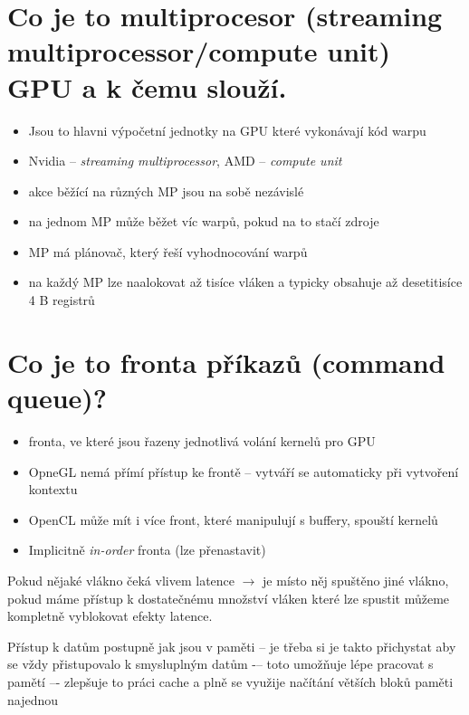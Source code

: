 \section{Co je to multiprocesor (streaming multiprocessor/compute unit) GPU a k čemu slouží.}
	\begin{itemize}
		\setlength\itemsep{0em}
		\item Jsou to hlavni výpočetní jednotky na GPU které vykonávají kód warpu
		\item Nvidia -- \emph{streaming multiprocessor}, AMD -- \emph{compute unit}
		\item akce běžící na různých MP jsou na sobě nezávislé
		\item na jednom MP může běžet víc warpů, pokud na to stačí zdroje
		\item MP má plánovač, který řeší vyhodnocování warpů
		\item na každý MP lze naalokovat až tisíce vláken a typicky obsahuje až desetitisíce 4 B registrů
	\end{itemize}


\section{Co je to fronta příkazů (command queue)?}
	\begin{itemize}
		\setlength\itemsep{0em}
		\item fronta, ve které jsou řazeny jednotlivá volání kernelů pro GPU
		\item OpneGL nemá přímí přístup ke frontě -- vytváří se automaticky při vytvoření kontextu
		\item OpenCL může mít i více front, které manipulují s buffery, spouští kernelů
		\item Implicitně \emph{in-order} fronta (lze přenastavit)
	\end{itemize}




	Pokud nějaké vlákno čeká vlivem latence $\rightarrow$ je místo něj spuštěno jiné vlákno, pokud máme přístup k dostatečnému množství vláken které lze spustit můžeme kompletně vyblokovat efekty latence.




	Přístup k datům postupně jak jsou v paměti – je třeba si je takto přichystat aby se vždy přistupovalo k smysluplným datům -– toto umožňuje lépe pracovat s pamětí –- zlepšuje to práci cache a plně se využije načítání větších bloků paměti najednou


